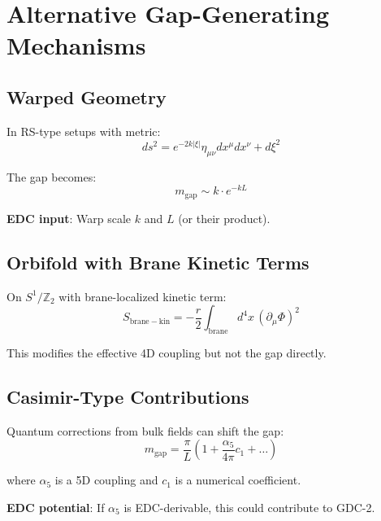 \documentclass[11pt,a4paper]{article}
\newcommand{\mgap}{m_{\mathrm{gap}}}
\theoremstyle{definition}
\theoremstyle{plain}
\theoremstyle{remark}
\begin{document}
\section{Alternative Gap-Generating Mechanisms}
\label{sec:alternatives}

\subsection{Warped Geometry}

In RS-type setups with metric:
\begin{equation}
ds^2 = e^{-2k|\xi|}\eta_{\mu\nu}dx^\mu dx^\nu + d\xi^2
\label{eq:warped-metric}
\end{equation}

The gap becomes:
\begin{equation}
\mgap \sim k \cdot e^{-kL}
\label{eq:warped-gap}
\end{equation}

\textbf{EDC input}: Warp scale $k$ and $L$ (or their product).

\subsection{Orbifold with Brane Kinetic Terms}

On $S^1/\mathbb{Z}_2$ with brane-localized kinetic term:
\begin{equation}
S_{\mathrm{brane-kin}} = -\frac{r}{2}\int_{\mathrm{brane}} d^4x\, (\partial_\mu\Phi)^2
\label{eq:brane-kinetic}
\end{equation}

This modifies the effective 4D coupling but not the gap directly.

\subsection{Casimir-Type Contributions}

Quantum corrections from bulk fields can shift the gap:
\begin{equation}
\mgap = \frac{\pi}{L}\left(1 + \frac{\alpha_5}{4\pi}c_1 + \ldots\right)
\label{eq:casimir-correction}
\end{equation}

where $\alpha_5$ is a 5D coupling and $c_1$ is a numerical coefficient.

\textbf{EDC potential}: If $\alpha_5$ is EDC-derivable, this could contribute to GDC-2.
\end{document}
